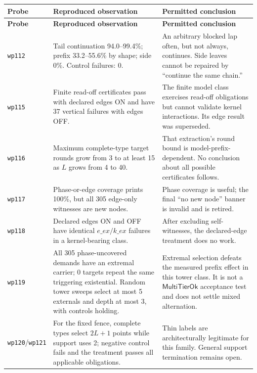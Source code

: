 \documentclass[11pt,letterpaper]{article}
\newcommand{\MultiTierOk}{\ensuremath{\mathsf{MultiTierOk}}}
\newcommand{\code}[1]{\nolinkurl{#1}}
\theoremstyle{definition}
\theoremstyle{plain}
\theoremstyle{remark}
\begin{document}
\begin{longtable}{>{\raggedright\arraybackslash}p{}
                  >{\raggedright\arraybackslash}p{}
                  >{\raggedright\arraybackslash}p{}}
\toprule
\textbf{Probe} & \textbf{Reproduced observation} & \textbf{Permitted conclusion} \\
\midrule
\endfirsthead
\toprule
\textbf{Probe} & \textbf{Reproduced observation} & \textbf{Permitted conclusion} \\
\midrule
\endhead
\code{wp112} &
Tail continuation 94.0--99.4\%; prefix 33.2--55.6\% by shape; side 0\%.
Control failures: 0. &
An arbitrary blocked lap often, but not always, continues.  Side leaves cannot
be repaired by ``continue the same chain.'' \\
\code{wp115} &
Finite read-off certificates pass with declared edges ON and have 37 vertical
failures with edges OFF. &
The finite model class exercises read-off obligations but cannot validate
kernel interactions.  Its edge result was superseded. \\
\code{wp116} &
Maximum complete-type target rounds grow from 3 to at least 15 as $L$ grows
from 4 to 40. &
That extraction's round bound is model-prefix-dependent.  No conclusion about
all possible certificates follows. \\
\code{wp117} &
Phase-or-edge coverage prints 100\%, but all 305 edge-only witnesses are new
nodes. &
Phase coverage is useful; the final ``no new node'' banner is invalid and is
retired. \\
\code{wp118} &
Declared edges ON and OFF have identical $e\_ex/k\_ex$ failures in a
kernel-bearing class. &
After excluding self-witnesses, the declared-edge treatment does no work. \\
\code{wp119} &
All 305 phase-uncovered demands have an extremal carrier; 0 targets repeat the
same triggering existential.  Random tower sweeps select at most 5 externals
and depth at most 3, with controls holding. &
Extremal selection defeats the measured prefix effect in this tower class.  It
is not a \MultiTierOk{} acceptance test and does not settle mixed alternation. \\
\code{wp120}/\code{wp121} &
For the fixed fence, complete types select $2L+1$ points while support uses 2;
negative control fails and the treatment passes all applicable obligations. &
Thin labels are architecturally legitimate for this family.  General support
termination remains open. \\
\bottomrule
\end{longtable}
\end{document}
